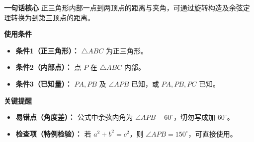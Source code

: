 \begin{summarybox}
	\textbf{\textcolor{CSummary}{一句话核心}}
	正三角形内部一点到两顶点的距离与夹角，可通过旋转构造及余弦定理转换为到第三顶点的距离。

	\medskip
	\textbf{\textcolor{CSummary}{使用条件}}
	\begin{itemize}[leftmargin=*, itemsep=0.5em, topsep=0.4em]
		\item \textbf{条件1（正三角形）：} $\triangle ABC$ 为正三角形。
		\item \textbf{条件2（内部点）：} 点 $P$ 在 $\triangle ABC$ 内部。
		\item \textbf{条件3（已知量）：} $PA,PB$ 及 $\angle APB$ 已知，或 $PA,PB,PC$ 已知。
	\end{itemize}

	\medskip
	\textbf{\textcolor{CSummary}{关键提醒}}
	\begin{itemize}[leftmargin=*, itemsep=0.5em, topsep=0.4em]
		\item \textbf{易错点（角度差）：} 公式中余弦内角为 $\angle APB-60^\circ$，切勿写成加 $60^\circ$。
		\item \textbf{检查项（特例检验）：} 若 $a^2+b^2=c^2$，则 $\angle APB=150^\circ$，可直接使用。
	\end{itemize}

\end{summarybox}
